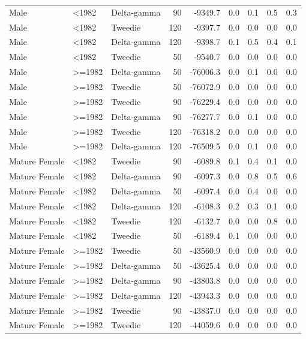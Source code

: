 \documentclass[
]{article}
\begin{document}
\begin{table}
{\begin{tabular}[t]{lllrrrrrr}
Male & <1982 & Delta-gamma & 90 & -9349.7 & 0.0 & 0.1 & 0.5 & 0.3\\
\addlinespace
Male & <1982 & Tweedie & 120 & -9397.7 & 0.0 & 0.0 & 0.0 & 0.0\\
Male & <1982 & Delta-gamma & 120 & -9398.7 & 0.1 & 0.5 & 0.4 & 0.1\\
Male & <1982 & Tweedie & 50 & -9540.7 & 0.0 & 0.0 & 0.0 & 0.0\\
Male & >=1982 & Delta-gamma & 50 & -76006.3 & 0.0 & 0.1 & 0.0 & 0.0\\
Male & >=1982 & Tweedie & 50 & -76072.9 & 0.0 & 0.0 & 0.0 & 0.0\\
\addlinespace
Male & >=1982 & Tweedie & 90 & -76229.4 & 0.0 & 0.0 & 0.0 & 0.0\\
Male & >=1982 & Delta-gamma & 90 & -76277.7 & 0.0 & 0.1 & 0.0 & 0.0\\
Male & >=1982 & Tweedie & 120 & -76318.2 & 0.0 & 0.0 & 0.0 & 0.0\\
Male & >=1982 & Delta-gamma & 120 & -76509.5 & 0.0 & 0.1 & 0.0 & 0.0\\
Mature Female & <1982 & Tweedie & 90 & -6089.8 & 0.1 & 0.4 & 0.1 & 0.0\\
\addlinespace
Mature Female & <1982 & Delta-gamma & 90 & -6097.3 & 0.0 & 0.8 & 0.5 & 0.6\\
Mature Female & <1982 & Delta-gamma & 50 & -6097.4 & 0.0 & 0.4 & 0.0 & 0.0\\
Mature Female & <1982 & Delta-gamma & 120 & -6108.3 & 0.2 & 0.3 & 0.1 & 0.0\\
Mature Female & <1982 & Tweedie & 120 & -6132.7 & 0.0 & 0.0 & 0.8 & 0.0\\
Mature Female & <1982 & Tweedie & 50 & -6189.4 & 0.1 & 0.0 & 0.0 & 0.0\\
\addlinespace
Mature Female & >=1982 & Tweedie & 50 & -43560.9 & 0.0 & 0.0 & 0.0 & 0.0\\
Mature Female & >=1982 & Delta-gamma & 50 & -43625.4 & 0.0 & 0.0 & 0.0 & 0.0\\
Mature Female & >=1982 & Delta-gamma & 90 & -43803.8 & 0.0 & 0.0 & 0.0 & 0.0\\
Mature Female & >=1982 & Delta-gamma & 120 & -43943.3 & 0.0 & 0.0 & 0.0 & 0.0\\
Mature Female & >=1982 & Tweedie & 90 & -43837.0 & 0.0 & 0.0 & 0.0 & 0.0\\
\addlinespace
Mature Female & >=1982 & Tweedie & 120 & -44059.6 & 0.0 & 0.0 & 0.0 & 0.0\\
\bottomrule
\end{tabular}}
\end{table}
\end{document}

